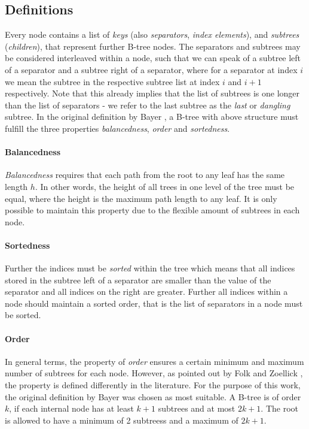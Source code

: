\subsection{Definitions}
\label{sec:data_structure_defs}

Every node contains a list of \textit{keys} (also \textit{separators}, \textit{index elements}), and \textit{subtrees} (\textit{children}),
that represent further B-tree nodes.
The separators and subtrees may be considered interleaved within a node,
such that we can speak of a subtree left of a separator and a subtree right of a separator,
where for a separator at index $i$ we mean the subtree in the respective
subtree list at index $i$ and $i+1$ respectively.
Note that this already implies that the list of subtrees is one
longer than the list of separators - we refer to the last subtree
as the \textit{last} or \textit{dangling} subtree.
In the original definition by Bayer \parencite{DBLP:journals/acta/BayerM72},
a B-tree with above structure must fulfill the three properties
\textit{balancedness}, \textit{order} and \textit{sortedness}.

\paragraph{Balancedness} \textit{Balancedness} requires
that each path from the root to any leaf has the same length $h$.
In other words, the height of all trees in one level of the tree must be equal,
where the height is the maximum path length to any leaf.
It is only possible to maintain this property
due to the flexible amount of subtrees in each node.

\paragraph{Sortedness} Further the indices must be \textit{sorted} within the tree which means that all indices stored
in the subtree left of a separator are smaller than the value of the separator
and all indices on the right are greater.
Further all indices within a node should maintain a sorted order,
that is the list of separators in a node must be sorted.

\paragraph{Order} In general terms, the property of \textit{order} ensures a certain minimum and maximum
number of subtrees for each node.
However, as pointed out by Folk and Zoellick \parencite{DBLP:books/daglib/0095349_mod},
the property is defined differently in the literature.
For the purpose of this work, the original definition by Bayer
was chosen as most suitable.
A B-tree is of order $k$, if each internal node has at least $k+1$
subtrees and at most $2k+1$.
The root is allowed to have a minimum of 2 subtreess and a maximum of $2k+1$.

